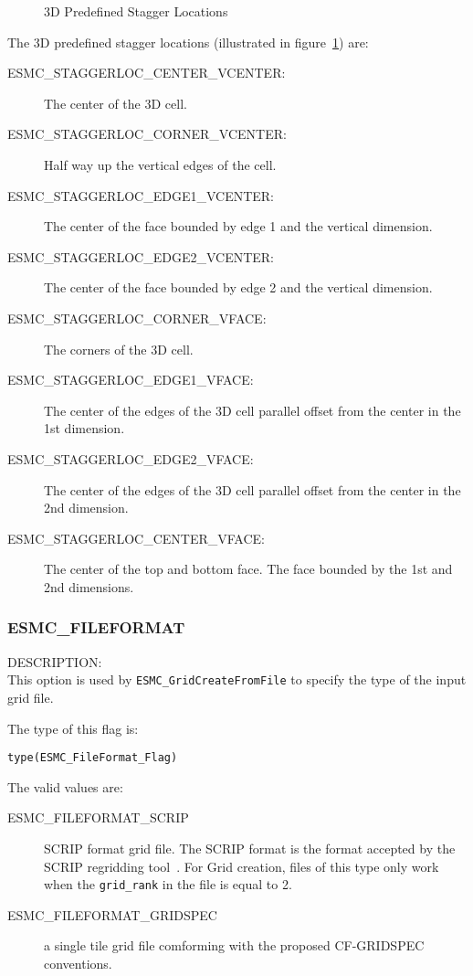\medskip

\begin{center}
\begin{figure}
\center
{}
\caption{3D Predefined Stagger Locations}
\label{fig:gridstaggerloc3d}
\end{figure}
\end{center}

The 3D predefined stagger locations (illustrated in figure~\ref{fig:gridstaggerloc3d}) are:\\
\begin{description}
\item [ESMC\_STAGGERLOC\_CENTER\_VCENTER:] The center of the 3D cell.
\item [ESMC\_STAGGERLOC\_CORNER\_VCENTER:] Half way up the vertical edges of the cell.
\item [ESMC\_STAGGERLOC\_EDGE1\_VCENTER:] The center of the face bounded by edge 1 and the vertical dimension.
\item [ESMC\_STAGGERLOC\_EDGE2\_VCENTER:] The center of the face bounded by edge 2 and the vertical dimension. 
\item [ESMC\_STAGGERLOC\_CORNER\_VFACE:] The corners of the 3D cell.
\item [ESMC\_STAGGERLOC\_EDGE1\_VFACE:] The center of the edges of the 3D cell parallel offset from the center in the 1st dimension.
\item [ESMC\_STAGGERLOC\_EDGE2\_VFACE:] The center of the edges of the 3D cell parallel offset from the center in the 2nd dimension.
\item [ESMC\_STAGGERLOC\_CENTER\_VFACE:] The center of the top and bottom face. The face bounded by the 1st and 2nd dimensions. 
\end{description}

\subsubsection{ESMC\_FILEFORMAT}
\label{const:cfileformat}

{\sf DESCRIPTION:\\}
This option is used by {\tt ESMC\_GridCreateFromFile} to specify the type of the input grid file.

The type of this flag is:

{\tt type(ESMC\_FileFormat\_Flag)}

The valid values are:
\begin{description}
\item [ESMC\_FILEFORMAT\_SCRIP] SCRIP format grid file. The SCRIP format is the format accepted by the SCRIP regridding tool~\cite{ref:SCRIP}.   For Grid creation, files of this type only work when the {\tt grid\_rank} in the file is equal to 2.

\item [ESMC\_FILEFORMAT\_GRIDSPEC] a single tile grid file comforming with the proposed CF-GRIDSPEC conventions.
\end{description}
